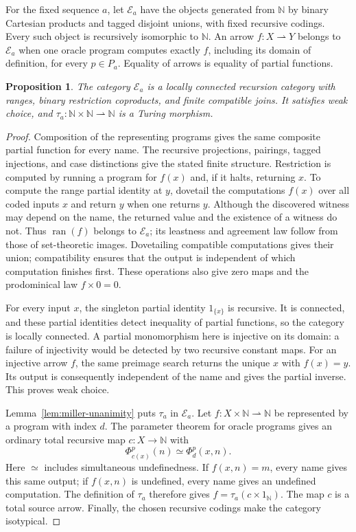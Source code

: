 \documentclass[11pt]{article}
\newtheorem{proposition}[theorem]{Proposition}
\newcommand{\N}{\mathbb N}
\newcommand{\ran}{\operatorname{ran}}
\begin{document}
For the fixed sequence $a$, let $\mathcal E_a$ have the
objects generated from $\N$ by binary Cartesian products and tagged
disjoint unions, with fixed recursive codings. Every such object is
recursively isomorphic to $\N$. An arrow $f:X\rightharpoonup Y$ belongs
to $\mathcal E_a$ when one oracle program computes exactly $f$, including
its domain of definition, for every $p\in P_a$. Equality of arrows is
equality of partial functions.

\begin{proposition}\label{prop:miller-category}
The category $\mathcal E_a$ is a locally connected recursion category
with ranges, binary restriction coproducts, and finite compatible joins.
It satisfies weak choice, and $\tau_a:\N\times\N\rightharpoonup\N$
is a Turing morphism.
\end{proposition}
\begin{proof}
Composition of the representing programs gives the same composite
partial function for every name. The recursive projections, pairings,
tagged injections, and case distinctions give the stated finite
structure. Restriction is computed by running a program for $f(x)$ and,
if it halts, returning $x$. To compute the range partial identity at
$y$, dovetail the computations $f(x)$ over all coded inputs $x$ and
return $y$ when one returns $y$. Although the discovered witness may
depend on the name, the returned value and the existence of a witness
do not. Thus $\ran(f)$ belongs to $\mathcal E_a$; its leastness and
agreement law follow from those of set-theoretic images.
Dovetailing compatible computations gives their union;
compatibility ensures that the output is independent of which
computation finishes first. These operations also give zero maps and
the prodominical law $f\times0=0$.

For every input $x$, the singleton partial identity $1_{\{x\}}$ is
recursive. It is connected, and these partial identities detect
inequality of partial functions, so the category is locally connected.
A partial monomorphism here is injective on its domain: a failure of
injectivity would be detected by two recursive constant maps. For an
injective arrow $f$, the same preimage search returns the unique $x$
with $f(x)=y$. Its output is consequently independent of the name and
gives the partial inverse. This proves weak choice.

Lemma~\ref{lem:miller-unanimity} puts $\tau_a$ in $\mathcal E_a$.
Let $f:X\times\N\rightharpoonup\N$ be represented by a program with
index $d$. The parameter theorem for oracle programs gives an ordinary
total recursive map $c:X\to\N$ with
\[
 \Phi_{c(x)}^p(n)\simeq\Phi_d^p(x,n).
\]
Here $\simeq$ includes simultaneous undefinedness.
If $f(x,n)=m$, every name gives this same output; if $f(x,n)$ is
undefined, every name gives an undefined computation. The definition
of $\tau_a$ therefore gives
$f=\tau_a(c\times1_{\N})$. The map $c$ is a total source arrow.
Finally, the chosen recursive codings make the category isotypical.
\end{proof}
\end{document}
